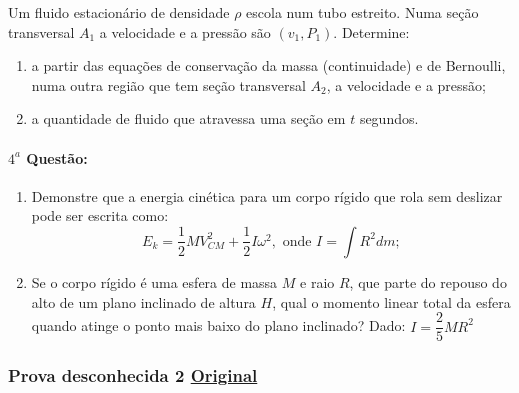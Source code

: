 \documentclass[12pt,a4paper]{article}
\newcommand{\original}[1]{\tiny \href{#1}{Original} \normalsize}
\begin{document}
Um fluido estacionário de densidade $\rho$ escola num tubo estreito. Numa seção transversal $A_1$ a velocidade e a pressão são $(v_1, P_1)$. Determine:

\begin{enumerate}[label=\alph*)]
\item a partir das equações de conservação da massa (continuidade) e de Bernoulli, numa outra região que tem seção transversal $A_2$, a velocidade e a pressão;
\item a quantidade de fluido que atravessa uma seção em $t$ segundos.
\end{enumerate}

\paragraph{$4^a$ Questão:}

\begin{enumerate}[label=\alph*)]
\item Demonstre que a energia cinética para um corpo rígido que rola sem deslizar pode ser escrita como:
$$E_k=\dfrac{1}{2}MV^2_{CM} + \dfrac{1}{2}I\omega^2,\textrm{ onde } I=\int R^2 dm;$$
\item Se o corpo rígido é uma esfera de massa $M$ e raio $R$, que parte do repouso do alto de um plano inclinado de altura $H$, qual o momento
linear total da esfera quando atinge o ponto mais baixo do plano inclinado? Dado: $I=\dfrac{2}{5}MR^2$
\end{enumerate}

\newpage

\subsubsection{Prova desconhecida 2 \original{https://drive.google.com/open?id=1IT7Nj9lLxmaPS4_iWg03e14R_fMooi5l}}
\end{document}
